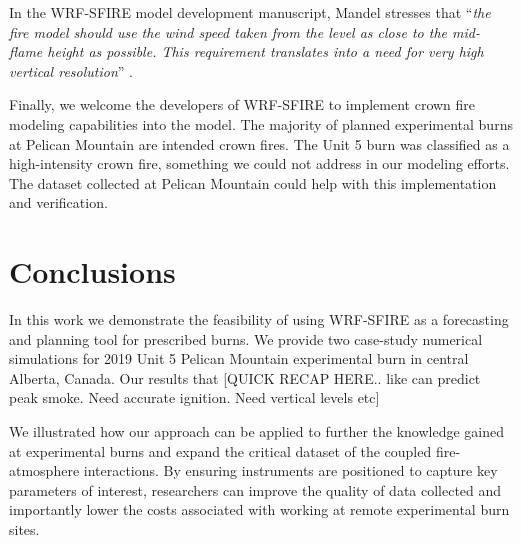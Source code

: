 \documentclass[preprints,article,accept,moreauthors,pdftex]{Definitions/mdpi}
\begin{document}
In the WRF-SFIRE model development manuscript, Mandel stresses that ``\textit{the fire model should use the wind speed taken from the level as close to the mid-flame height as possible. This requirement translates into a need for very high vertical resolution}'' \cite{mandel_coupled_2011}.

Finally, we welcome the developers of WRF-SFIRE to implement crown fire modeling capabilities into the model. The majority of planned experimental burns at Pelican Mountain are intended crown fires. The Unit 5 burn was classified as a high-intensity crown fire, something we could not address in our modeling efforts. The dataset collected at Pelican Mountain could help with this implementation and verification.


\section{Conclusions}

In this work we demonstrate the feasibility of using WRF-SFIRE as a forecasting and planning tool for prescribed burns. We provide two case-study numerical simulations for 2019 Unit 5 Pelican Mountain experimental burn in central Alberta, Canada. Our results  that [QUICK RECAP HERE.. like can predict peak smoke. Need accurate ignition. Need vertical levels etc]

We illustrated how our approach can be applied to further the knowledge gained at experimental burns and expand the critical dataset of the coupled fire-atmosphere interactions. By ensuring instruments are positioned to capture key parameters of interest, researchers can improve the quality of data collected and importantly lower the costs associated with working at remote experimental burn sites.

\vspace{6pt}


\end{document}

